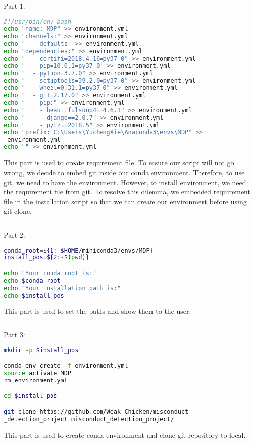 \documentclass[twoside,a4paper]{refart}
\begin{document}
$\ $

Part 1:
\begin{lstlisting}[language=bash]
#!/usr/bin/env bash
echo "name: MDP" >> environment.yml
echo "channels:" >> environment.yml
echo "  - defaults" >> environment.yml
echo "dependencies:" >> environment.yml
echo "  - certifi=2018.4.16=py37_0" >> environment.yml
echo "  - pip=10.0.1=py37_0" >> environment.yml
echo "  - python=3.7.0" >> environment.yml
echo "  - setuptools=39.2.0=py37_0" >> environment.yml
echo "  - wheel=0.31.1=py37_0" >> environment.yml
echo "  - git=2.17.0" >> environment.yml
echo "  - pip:" >> environment.yml
echo "    - beautifulsoup4==4.6.1" >> environment.yml
echo "    - django==2.0.7" >> environment.yml
echo "    - pytz==2018.5" >> environment.yml
echo "prefix: C:\Users\YuchengXie\Anaconda3\envs\MDP" >>
 environment.yml
echo "" >> environment.yml
\end{lstlisting}

This part is used to create requirement file. To ensure our script will not go wrong, we decide to embed git inside our conda environment. Therefore, to use git, we need to have the environment. However, to install environment, we need the requirement file from git. To resolve this dilemma, we embedded requirement file in the installation script so that we can create our environment before using git clone.

$\ $

Part 2:
\begin{lstlisting}[language=bash]
conda_root=${1:-$HOME/miniconda3/envs/MDP}
install_pos=${2:-$(pwd)}

echo "Your conda root is:"
echo $conda_root
echo "Your installation path is:"
echo $install_pos
\end{lstlisting}

This part is used to set the paths and show them to the user.

$\ $

Part 3:
\begin{lstlisting}[language=bash]
mkdir -p $install_pos

conda env create -f environment.yml
source activate MDP
rm environment.yml

cd $install_pos

git clone https://github.com/Weak-Chicken/misconduct
_detection_project misconduct_detection_project/
\end{lstlisting}

This part is used to create conda environment and clone git repository to local.
\end{document}
